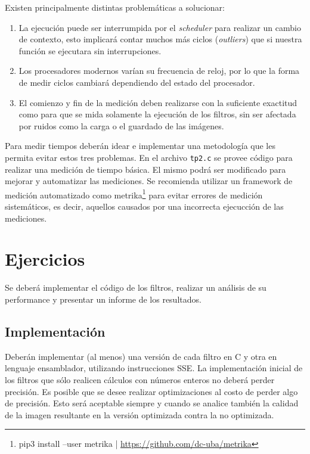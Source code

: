 \documentclass[a4paper, 12pt]{article}
\newcommand{\code}[1]{{\sffamily #1}\xspace}
\begin{document}
Existen principalmente distintas problemáticas a solucionar:

\begin{enumerate}
 \item La ejecución puede ser interrumpida por el \emph{scheduler} para realizar un cambio de contexto, esto implicará contar muchos más ciclos (\emph{outliers}) que si nuestra función se ejecutara sin interrupciones.
 \item Los procesadores modernos varían su frecuencia de reloj, por lo que la forma de medir ciclos cambiará dependiendo del estado del procesador.
 \item El comienzo y fin de la medición deben realizarse con la suficiente
 exactitud como para que se mida solamente la ejecución de los filtros, sin
 ser afectada por ruidos como la carga o el guardado de las imágenes.
\end{enumerate}

Para medir tiempos deberán idear e implementar una metodología que les permita evitar estos tres problemas.
En el archivo \texttt{tp2.c} se provee código para realizar una
medición de tiempo básica. El mismo podrá ser modificado para
mejorar y automatizar las mediciones.
Se recomienda utilizar un framework de medición automatizado
como \code{metrika}\footnote{pip3 install --user metrika |
\url{https://github.com/dc-uba/metrika}}
para evitar errores de medición sistemáticos, es decir, aquellos
causados por una incorrecta ejecucción de las mediciones.





\section{Ejercicios}

Se deberá implementar el código de los filtros, realizar
un análisis de su performance y presentar un informe de los
resultados.

\subsection{Implementación}

Deberán implementar (al menos) una versión de cada filtro en C y otra en lenguaje ensamblador, utilizando instrucciones SSE.
La implementación inicial de los filtros que sólo realicen cálculos
con números enteros no deberá perder precisión. Es posible que se
desee realizar optimizaciones al costo de perder algo de precisión.
Esto será aceptable siempre y cuando se analice también la calidad
de la imagen resultante en la versión optimizada contra la no
optimizada.
\end{document}
